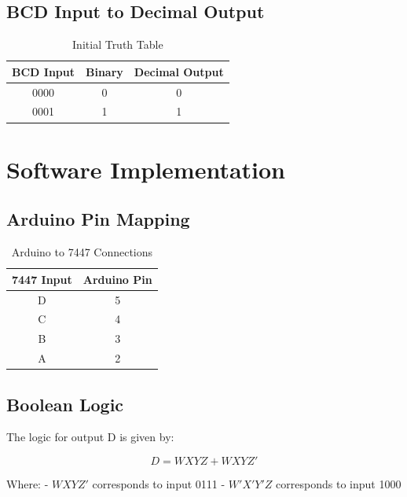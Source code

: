 \documentclass[12pt]{article}
\begin{document}
\subsection{BCD Input to Decimal Output}
\begin{table}[h!]
\centering
\begin{tabular}{|c|c|c|}
\hline
\textbf{BCD Input} & \textbf{Binary} & \textbf{Decimal Output} \\
\hline
0000 & 0 & 0 \\
0001 & 1 & 1 \\
\hline
\end{tabular}
\caption{Initial Truth Table}
\end{table}

\section{Software Implementation}

\subsection{Arduino Pin Mapping}
\begin{table}[h!]
\centering
\begin{tabular}{|c|c|}
\hline
\textbf{7447 Input} & \textbf{Arduino Pin} \\
\hline
D & 5 \\
C & 4 \\
B & 3 \\
A & 2 \\
\hline
\end{tabular}
\caption{Arduino to 7447 Connections}
\end{table}

\subsection{Boolean Logic}
The logic for output D is given by:


\[
D = WXYZ + WXYZ'
\]



Where:
- \( WXYZ' \) corresponds to input 0111
- \( W'X'Y'Z \) corresponds to input 1000
\end{document}
